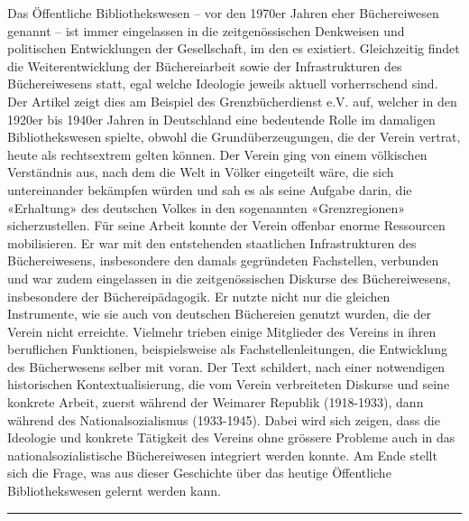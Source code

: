 Das Öffentliche Bibliothekswesen -- vor den 1970er Jahren eher
Büchereiwesen genannt -- ist immer eingelassen in die zeitgenössischen
Denkweisen und politischen Entwicklungen der Gesellschaft, im den es
existiert. Gleichzeitig findet die Weiterentwicklung der Büchereiarbeit
sowie der Infrastrukturen des Büchereiwesens statt, egal welche
Ideologie jeweils aktuell vorherrschend sind. Der Artikel zeigt dies am
Beispiel des Grenzbücherdienst e.V. auf, welcher in den 1920er bis
1940er Jahren in Deutschland eine bedeutende Rolle im damaligen
Bibliothekswesen spielte, obwohl die Grundüberzeugungen, die der Verein
vertrat, heute als rechtsextrem gelten können. Der Verein ging von einem
völkischen Verständnis aus, nach dem die Welt in Völker eingeteilt wäre,
die sich untereinander bekämpfen würden und sah es als seine Aufgabe
darin, die «Erhaltung» des deutschen Volkes in den sogenannten
«Grenzregionen» sicherzustellen. Für seine Arbeit konnte der Verein
offenbar enorme Ressourcen mobilisieren. Er war mit den entstehenden
staatlichen Infrastrukturen des Büchereiwesens, insbesondere den damals
gegründeten Fachstellen, verbunden und war zudem eingelassen in die
zeitgenössischen Diskurse des Büchereiwesens, insbesondere der
Büchereipädagogik. Er nutzte nicht nur die gleichen Instrumente, wie sie
auch von deutschen Büchereien genutzt wurden, die der Verein nicht
erreichte. Vielmehr trieben einige Mitglieder des Vereins in ihren
beruflichen Funktionen, beispielsweise als Fachstellenleitungen, die
Entwicklung des Bücherwesens selber mit voran. Der Text schildert, nach
einer notwendigen historischen Kontextualisierung, die vom Verein
verbreiteten Diskurse und seine konkrete Arbeit, zuerst während der
Weimarer Republik (1918-1933), dann während des Nationalsozialismus
(1933-1945). Dabei wird sich zeigen, dass die Ideologie und konkrete
Tätigkeit des Vereins ohne grössere Probleme auch in das
nationalsozialistische Büchereiwesen integriert werden konnte. Am Ende
stellt sich die Frage, was aus dieser Geschichte über das heutige
Öffentliche Bibliothekswesen gelernt werden kann.

\begin{center}\rule{0.5\linewidth}{0.5pt}\end{center}

